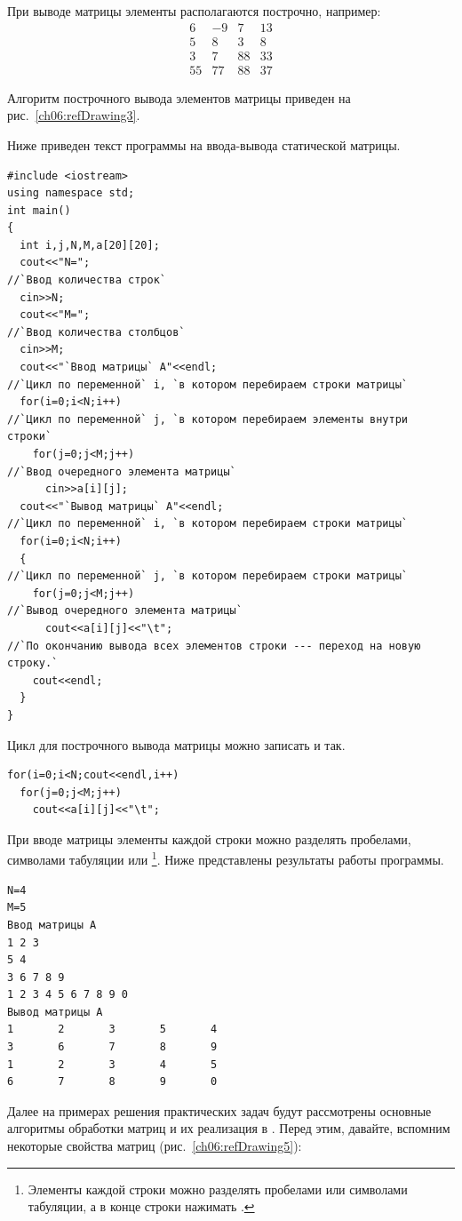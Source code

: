 При выводе матрицы элементы располагаются построчно, например:
$$\begin{matrix}6&-9&7&13\\5&8&3&8\\3&7&88&33\\55&77&88&37\end{matrix}$$

Алгоритм построчного вывода элементов матрицы приведен на рис.~\ref{ch06:refDrawing3}.


Ниже приведен текст программы на  ввода-вывода статической матрицы.
\begin{lstlisting}
#include <iostream>
using namespace std;
int main()
{
  int i,j,N,M,a[20][20];
  cout<<"N=";
//`Ввод количества строк`
  cin>>N;
  cout<<"M=";
//`Ввод количества столбцов`
  cin>>M;
  cout<<"`Ввод матрицы` A"<<endl;
//`Цикл по переменной` i, `в котором перебираем строки матрицы`
  for(i=0;i<N;i++)
//`Цикл по переменной` j, `в котором перебираем элементы внутри строки`
    for(j=0;j<M;j++)
//`Ввод очередного элемента матрицы`
      cin>>a[i][j];
  cout<<"`Вывод матрицы` A"<<endl;
//`Цикл по переменной` i, `в котором перебираем строки матрицы`
  for(i=0;i<N;i++)
  {
//`Цикл по переменной` j, `в котором перебираем строки матрицы`
    for(j=0;j<M;j++)
//`Вывод очередного элемента матрицы`
      cout<<a[i][j]<<"\t";
//`По окончанию вывода всех элементов строки --- переход на новую строку.`
    cout<<endl;
  }
}
\end{lstlisting}

Цикл для построчного вывода матрицы можно записать и так.
\begin{lstlisting}
for(i=0;i<N;cout<<endl,i++)
  for(j=0;j<M;j++)
    cout<<a[i][j]<<"\t";
\end{lstlisting}
При вводе матрицы элементы каждой строки можно разделять пробелами, символами табуляции или
\footnote{Элементы каждой строки можно разделять пробелами или символами табуляции, а в конце
строки нажимать .}. 
Ниже 
представлены результаты работы программы.
\begin{verbatim}
N=4
M=5
Ввод матрицы A
1 2 3
5 4
3 6 7 8 9
1 2 3 4 5 6 7 8 9 0
Вывод матрицы A
1       2       3       5       4	
3       6       7       8       9	
1       2       3       4       5	
6       7       8       9       0
\end{verbatim}

Далее на примерах решения практических задач будут рассмотрены основные алгоритмы обработки матриц и их реализация в
. Перед этим, давайте, вспомним некоторые свойства матриц (рис.~\ref{ch06:refDrawing5}):

